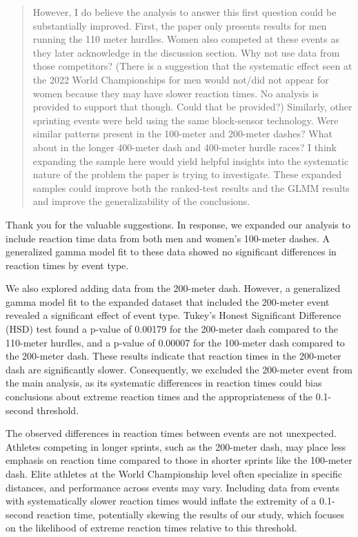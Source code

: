 \documentclass[12pt]{article}
\newenvironment{comment}%
{\begin{quotation}\noindent\small\it\color{darkblue}\ignorespaces%
}{\end{quotation}}
\begin{document}
\begin{comment}
However, I do believe the analysis to answer this first question could be
substantially improved. First, the paper only presents results for men running
the 110 meter hurdles. Women also competed at these events as they later
acknowledge in the discussion section. Why not use data from those competitors?
(There is a suggestion that the systematic effect seen at the 2022 World
Championships for men would not/did not appear for women because they may have
slower reaction times. No analysis is provided to support that though. Could
that be provided?) Similarly, other sprinting events were held using the same
block-sensor technology. Were similar patterns present in the 100-meter and
200-meter dashes? What about in the longer 400-meter dash and 400-meter hurdle
races? I think expanding the sample here would yield helpful insights into the
systematic nature of the problem the paper is trying to investigate. These
expanded samples could improve both the ranked-test results and the GLMM results
and improve the generalizability of the conclusions.
\end{comment}


Thank you for the valuable suggestions. In response, we expanded our
analysis to include reaction time data from both men and women's
100-meter dashes. A generalized gamma model fit to these data showed
no significant differences in reaction times by event type.


We also explored adding data from the 200-meter dash. However, a
generalized gamma model fit to the expanded dataset that included the
200-meter event revealed a significant effect of event type. Tukey’s
Honest Significant Difference (HSD) test found a p-value of 0.00179 for
the 200-meter dash compared to the 110-meter hurdles, and a p-value of
0.00007 for the 100-meter dash compared to the 200-meter dash.
These results indicate that reaction times in the 200-meter dash are
significantly slower. Consequently, we excluded the 200-meter event
from the main analysis, as its systematic differences in reaction
times could bias conclusions about extreme reaction times and the
appropriateness of the 0.1-second threshold.


The observed differences in reaction times between events are not
unexpected. Athletes competing in longer sprints, such as the
200-meter dash, may place less emphasis on reaction time compared to
those in shorter sprints like the 100-meter dash. Elite athletes at
the World Championship level often specialize in specific distances,
and performance across events may vary. Including data from events
with systematically slower reaction times would inflate the extremity
of a 0.1-second reaction time, potentially skewing the results of our
study, which focuses on the likelihood of extreme reaction times
relative to this threshold.
\end{document}
